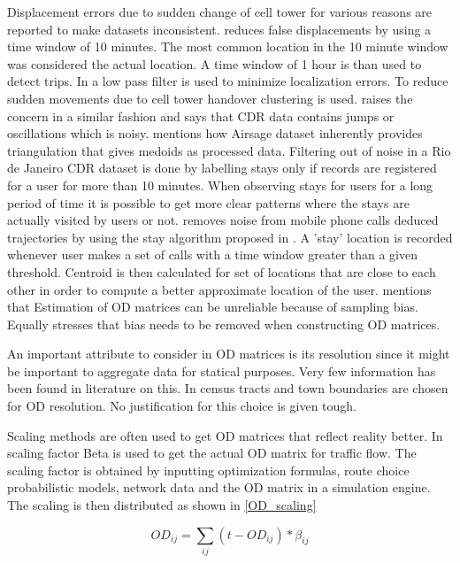 \documentclass[12pt, a4paper]{report}
\theoremstyle{definition}
\theoremstyle{definition}%
\theoremstyle{definition}%
\theoremstyle{definition}%
\theoremstyle{definition}%
\theoremstyle{definition}%
\begin{document}
Displacement errors due to sudden change of cell tower for various reasons are reported to make datasets inconsistent. \cite{Iqbal2014} reduces false displacements by using a time window of 10 minutes. The most common location in the 10 minute window was considered the actual location. A time window of 1 hour is than used to detect trips. In \cite{Calabrese2011} a low pass filter is used to minimize localization errors. To reduce sudden movements due to cell tower handover clustering is used.  \cite{Colak2015} raises the concern in a similar fashion and says that CDR data contains jumps or oscillations which is noisy. \cite{Colak2015} mentions how Airsage dataset inherently provides triangulation that gives medoids as processed data. Filtering out of noise in a Rio de Janeiro CDR dataset is done by labelling stays only if records are registered for a user for more than 10 minutes. When observing stays for users for a long period of time it is possible to get more clear patterns where the stays are actually visited by users or not. \cite{Toole2015} removes noise from mobile phone calls deduced trajectories by using the stay algorithm proposed in \cite{Zheng2011}. A 'stay' location is recorded whenever user makes a set of calls with a time window greater than a given threshold. Centroid is then calculated for set of locations that are close to each other in order to compute a better approximate location of the user. \cite{Iqbal2014} mentions that Estimation of OD matrices can be unreliable because of sampling bias. Equally \cite{Toole2015} stresses that bias needs to be removed when constructing OD matrices.

An important attribute to consider in OD matrices is its resolution since it might be important to aggregate data for statical purposes. Very few information has been found in literature on this. In \cite{Colak2015} census tracts and town boundaries are chosen for OD resolution. No justification for this choice is given tough.

Scaling methods are often used to get OD matrices that reflect reality better. In \cite{Iqbal2014} scaling factor Beta is used to get the actual OD matrix for traffic flow. The scaling factor is obtained by inputting optimization formulas, route choice probabilistic models, network data and the OD matrix in a simulation engine. The scaling is then distributed as shown in \ref{OD_scaling}

\begin{equation}\label{OD_scaling}
\textit{OD}_{ij} = \sum _{ij} (t - OD_{ij}) * \beta_{ij} 
\end{equation}
\end{document}

